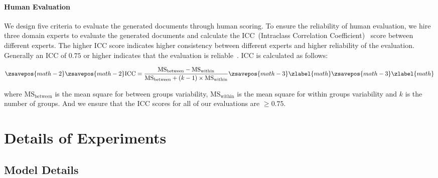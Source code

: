 \paragraph{Human Evaluation}

\label{app:HumanEvaluation}
We design five criteria to evaluate the generated documents through human scoring.
To ensure the reliability of human evaluation, we hire three domain experts to evaluate the generated documents and calculate the ICC~(Intraclass Correlation Coefficient)~\cite{shrout1979intraclass} score between different experts. The higher ICC score indicates higher consistency between different experts and higher reliability of the evaluation. Generally an ICC of $0.75$ or higher indicates that the evaluation is reliable~\cite{koo2016guideline}. ICC is calculated as follows:

\begin{equation}
    \zsavepos{math-2}
    \zsavepos{math-2}
    \text{ICC} = \frac{\text{MS}_{\text{between}} - \text{MS}_{\text{within}}}{\text{MS}_{\text{between}} + (k-1) \times \text{MS}_{\text{within}}}
    \zsavepos{math-3}
    \zlabel{math}    \zsavepos{math-3}
    \zlabel{math}\end{equation}

\noindent
where $\text{MS}_{\text{between}}$ is the mean square for between groups variability, $\text{MS}_{\text{within}}$ is the mean square for within groups variability and $k$ is the number of groups. And we ensure that the ICC scores for all of our evaluations are $\geq 0.75$.




\section{Details of Experiments
}

\label{app:Experiments}


\subsection{Model Details
}

